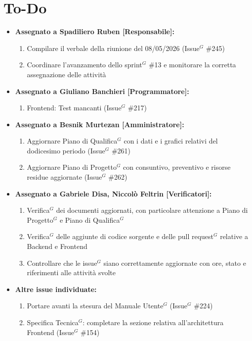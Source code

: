 \documentclass[a4paper,10pt]{article}
\begin{document}
\section*{To-Do}
\begin{itemize}
\item \textbf{Assegnato a Spadiliero Ruben [Responsabile]:}
    \begin{enumerate}
    \item Compilare il verbale della riunione del 08/05/2026 (Issue$^G$ \#245)
    \item Coordinare l'avanzamento dello sprint$^G$ \#13 e monitorare la corretta assegnazione delle attività
    \end{enumerate}

\item \textbf{Assegnato a Giuliano Banchieri [Programmatore]:}
    \begin{enumerate}
        \item Frontend: Test mancanti (Issue$^G$ \#217)
  \end{enumerate}

\item \textbf{Assegnato a Besnik Murtezan [Amministratore]:}
    \begin{enumerate}
    \item Aggiornare Piano di Qualifica$^G$ con i dati e i grafici relativi del dodicesimo periodo (Issue$^G$ \#261)
    \item Aggiornare Piano di Progetto$^G$ con consuntivo, preventivo e risorse residue aggiornate (Issue$^G$ \#262)
    \end{enumerate}

\item \textbf{Assegnato a Gabriele Disa, Niccolò Feltrin [Verificatori]:}
    \begin{enumerate}
    \item Verifica$^G$ dei documenti aggiornati, con particolare attenzione a Piano di Progetto$^G$ e Piano di Qualifica$^G$
    \item Verifica$^G$ delle aggiunte di codice sorgente e delle pull request$^G$ relative a Backend e Frontend
    \item Controllare che le issue$^G$ siano correttamente aggiornate con ore, stato e riferimenti alle attività svolte
    \end{enumerate}

\item \textbf{Altre issue individuate:}
    \begin{enumerate}
    \item Portare avanti la stesura del Manuale Utente$^G$ (Issue$^G$ \#224)
    \item Specifica Tecnica$^G$: completare la sezione relativa all'architettura Frontend (Issue$^G$ \#154)
    \end{enumerate}
\end{itemize}
\end{document}
